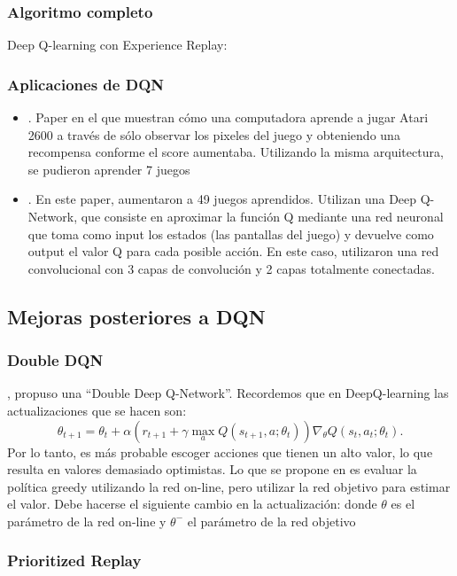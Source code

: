 \documentclass[11pt]{article}
\theoremstyle{plain}
\begin{document}
\subsubsection{Algoritmo completo}
Deep Q-learning con Experience Replay:
\subsubsection{Aplicaciones de DQN}
		\begin{itemize}
			\item \cite{mnih2013playing}. Paper en el que muestran cómo una computadora aprende a jugar Atari 2600 a través de sólo observar los pixeles del juego y obteniendo una 																		recompensa conforme el score aumentaba. Utilizando la misma arquitectura, se pudieron aprender 7 juegos
			\item \cite{mnih2015human}. En este paper, aumentaron a 49 juegos aprendidos. Utilizan una Deep Q-Network, que consiste en aproximar la función Q mediante una red 																			neuronal que toma como input los estados (las pantallas del juego) y devuelve como output el valor Q para cada posible acción. En este caso, 																			utilizaron una red convolucional con 3 capas de convolución y 2 capas totalmente conectadas.
	     \end{itemize}
\subsection{Mejoras posteriores a DQN}
\subsubsection{Double DQN}
\cite{hasselt2010double}, \cite{van2016deep} propuso una “Double Deep Q-Network”. Recordemos que en DeepQ-learning las actualizaciones que se hacen son:
\[ \theta_{t+1} = \theta_t + \alpha (r_{t+1} + \gamma \max_{a} Q(s_{t+1},a;\theta_t)) \nabla_\theta Q(s_t,a_t;\theta_t). \]
Por lo tanto, es más probable escoger acciones que tienen un alto valor, lo que resulta en valores demasiado optimistas. Lo que se propone en \cite{van2016deep} es evaluar la política greedy utilizando la red on-line, pero utilizar la red objetivo para estimar el valor. Debe hacerse el siguiente cambio en la actualización:
donde $\theta$ es el parámetro de la red on-line y $\theta^{-}$ el parámetro de la red objetivo
\subsubsection{Prioritized Replay}
\end{document}
